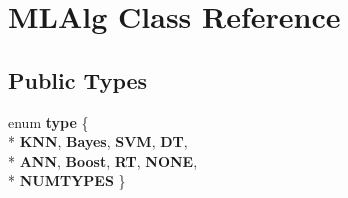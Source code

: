 \hypertarget{class_m_l_alg}{\section{M\-L\-Alg Class Reference}
\label{class_m_l_alg}
}
\subsection*{Public Types}
\begin{DoxyCompactItemize}
\item 
enum {\bfseries type} \{ \\*
{\bfseries K\-N\-N}, 
{\bfseries Bayes}, 
{\bfseries S\-V\-M}, 
{\bfseries D\-T}, 
\\*
{\bfseries A\-N\-N}, 
{\bfseries Boost}, 
{\bfseries R\-T}, 
{\bfseries N\-O\-N\-E}, 
\\*
{\bfseries N\-U\-M\-T\-Y\-P\-E\-S}
 \}
\end{DoxyCompactItemize}
